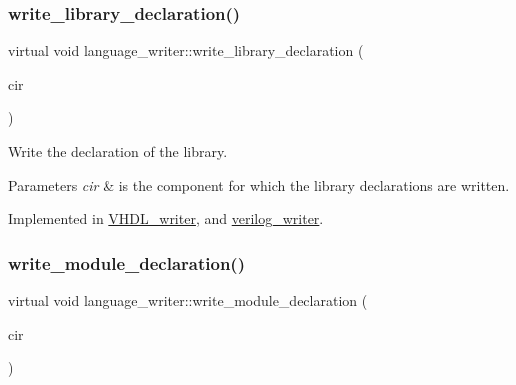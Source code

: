 \mbox{\label{classlanguage__writer_ab43debc2245af8078bb36b157d780aca}} 
\subsubsection{\texorpdfstring{write\+\_\+library\+\_\+declaration()}{write\_library\_declaration()}}
{\footnotesize\ttfamily virtual void language\+\_\+writer\+::write\+\_\+library\+\_\+declaration (\begin{DoxyParamCaption}\item[{const \hyperlink{structural__objects_8hpp_a8ea5f8cc50ab8f4c31e2751074ff60b2}{structural\+\_\+object\+Ref} \&}]{cir }\end{DoxyParamCaption})\hspace{0.3cm}{\ttfamily [pure virtual]}}



Write the declaration of the library. 


\begin{DoxyParams}{Parameters}
{\em cir} & is the component for which the library declarations are written. \\
\hline
\end{DoxyParams}


Implemented in \hyperlink{structVHDL__writer_ab617f377af475bddff6b07f327f8b058}{V\+H\+D\+L\+\_\+writer}, and \hyperlink{classverilog__writer_a271c63e96fc1d6907503b0a0698ef6f8}{verilog\+\_\+writer}.

\mbox{\label{classlanguage__writer_a32b5b9395eb518430fca70b1d49ff133}} 
\subsubsection{\texorpdfstring{write\+\_\+module\+\_\+declaration()}{write\_module\_declaration()}}
{\footnotesize\ttfamily virtual void language\+\_\+writer\+::write\+\_\+module\+\_\+declaration (\begin{DoxyParamCaption}\item[{const \hyperlink{structural__objects_8hpp_a8ea5f8cc50ab8f4c31e2751074ff60b2}{structural\+\_\+object\+Ref} \&}]{cir }\end{DoxyParamCaption})\hspace{0.3cm}{\ttfamily [pure virtual]}}



